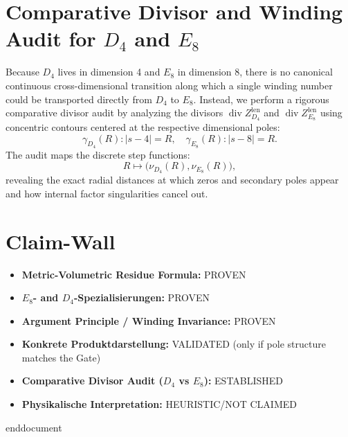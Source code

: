 \documentclass{article}
\begin{document}
\section{Comparative Divisor and Winding Audit for $D_4$ and $E_8$}

Because $D_4$ lives in dimension 4 and $E_8$ in dimension 8, there is no canonical continuous cross-dimensional transition along which a single winding number could be transported directly from $D_4$ to $E_8$. Instead, we perform a rigorous comparative divisor audit by analyzing the divisors $\operatorname{div} Z_{D_4}^{\mathrm{len}}$ and $\operatorname{div} Z_{E_8}^{\mathrm{len}}$ using concentric contours centered at the respective dimensional poles:
\[
\gamma_{D_4}(R): |s-4|=R, \quad \gamma_{E_8}(R): |s-8|=R.
\]
The audit maps the discrete step functions:
\[
R \mapsto \bigl(\nu_{D_4}(R), \nu_{E_8}(R)\bigr),
\]
revealing the exact radial distances at which zeros and secondary poles appear and how internal factor singularities cancel out.

\section{Claim-Wall}

\begin{itemize}
    \item \textbf{Metric-Volumetric Residue Formula:} PROVEN
    \item \textbf{$E_8$- and $D_4$-Spezialisierungen:} PROVEN
    \item \textbf{Argument Principle / Winding Invariance:} PROVEN
    \item \textbf{Konkrete Produktdarstellung:} VALIDATED (only if pole structure matches the Gate)
    \item \textbf{Comparative Divisor Audit ($D_4$ vs $E_8$):} ESTABLISHED
    \item \textbf{Physikalische Interpretation:} HEURISTIC/NOT CLAIMED
\end{itemize}

end{document}
\end{document}
